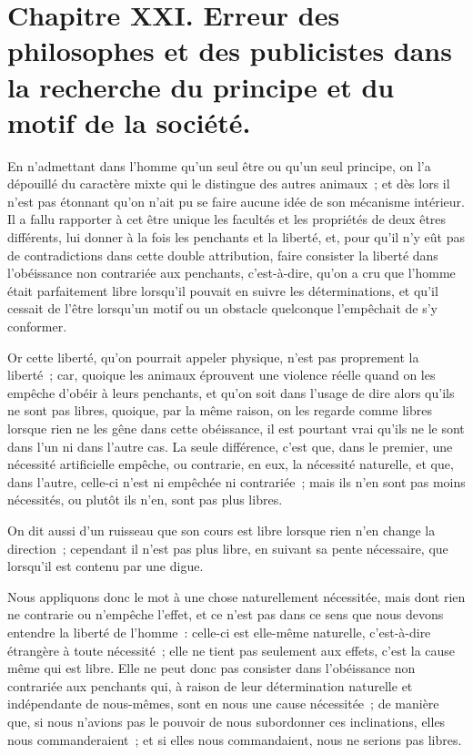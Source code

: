 \documentclass[french,twoside]{book} %
\newcommand\chapteropen{} %
\newcommand\chaptercont{} %
\begin{document}
\chapteropen
\chapter[{Chapitre XXI. Erreur des philosophes et des publicistes dans la recherche du principe et du motif de la société.}]{Chapitre XXI. Erreur des philosophes et des publicistes dans la recherche du principe et du motif de la société.}\renewcommand{\leftmark}{Chapitre XXI. Erreur des philosophes et des publicistes dans la recherche du principe et du motif de la société.}


\chaptercont
\noindent En n’admettant dans l’homme qu’un seul être ou qu’un seul principe, on l’a dépouillé du caractère mixte qui le distingue des autres animaux ; et dès lors il n’est pas étonnant qu’on n’ait pu se faire aucune idée de son mécanisme intérieur. Il a fallu rapporter à cet être unique les facultés et les propriétés de deux êtres différents, lui donner à la fois les penchants et la liberté, et, pour qu’il n’y eût pas de contradictions dans cette double attribution, faire consister la liberté dans l’obéissance non contrariée aux penchants, c’est-à-dire, qu’on a cru que l’homme était parfaitement libre lorsqu’il pouvait en suivre les déterminations, et qu’il cessait de l’être lorsqu’un motif ou un obstacle quelconque l’empêchait de s’y conformer.\par
Or cette liberté, qu’on pourrait appeler physique, n’est pas proprement la liberté ; car, quoique les animaux éprouvent une violence réelle quand on les empêche d’obéir à leurs penchants, et qu’on soit dans l’usage de dire alors qu’ils ne sont pas libres, quoique, par la même raison, on les regarde comme libres lorsque rien ne les gêne dans cette obéissance, il est pourtant vrai qu’ils ne le sont dans l’un ni dans l’autre cas. La seule différence, c’est que, dans le premier, une nécessité artificielle empêche, ou contrarie, en eux, la nécessité naturelle, et que, dans l’autre, celle-ci n’est ni empêchée ni contrariée ; mais ils n’en sont pas moins nécessités, ou plutôt ils n’en, sont pas plus libres.\par
On dit aussi d’un ruisseau que son cours est libre lorsque rien n’en change la direction ; cependant il n’est pas plus libre, en suivant sa pente nécessaire, que lorsqu’il est contenu par une digue.\par
Nous appliquons donc le mot à une chose naturellement nécessitée, mais dont rien ne contrarie ou n’empêche l’effet, et ce n’est pas dans ce sens que nous devons entendre la liberté de l’homme : celle-ci est elle-même naturelle, c’est-à-dire étrangère à toute nécessité ; elle ne tient pas seulement aux effets, c’est la cause même qui est libre. Elle ne peut donc pas consister dans l’obéissance non contrariée aux penchants qui, à raison de leur détermination naturelle et indépendante de nous-mêmes, sont en nous une cause nécessitée ; de manière que, si nous n’avions pas le pouvoir de nous subordonner ces inclinations, elles nous commanderaient ; et si elles nous commandaient, nous ne serions pas libres.\par
\end{document}
